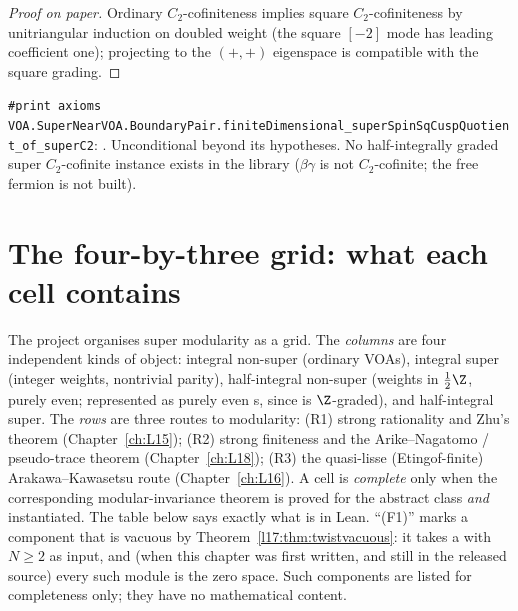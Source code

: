 \begin{proof}[Proof on paper]
Ordinary $C_2$-cofiniteness implies square $C_2$-cofiniteness by unitriangular induction on doubled
weight (the square $[-2]$ mode has leading coefficient one); projecting to the $(+,+)$ eigenspace is
compatible with the square grading.
\end{proof}
\begin{status}
\texttt{\#print axioms
VOA.SuperNearVOA.\allowbreak BoundaryPair.\allowbreak finiteDimensional\_\allowbreak superSpinSqCuspQuotient\_\allowbreak of\_superC2}:
. Unconditional beyond its hypotheses. No half-integrally
graded super $C_2$-cofinite instance exists in the library ($\beta\gamma$ is not $C_2$-cofinite; the free
fermion is not built).
\end{status}

\section{The four-by-three grid: what each cell contains}\label{l17:sec:grid}

The project organises super modularity as a grid. The \emph{columns} are four independent kinds of
object: integral non-super (ordinary VOAs), integral super (integer weights, nontrivial parity),
half-integral non-super (weights in $\frac12\Z$, purely even; represented as purely even
s, since  is $\Z$-graded), and
half-integral super. The \emph{rows} are three routes to modularity: (R1) strong rationality and Zhu's
theorem (Chapter~\ref{ch:L15}); (R2) strong finiteness and the Arike--Nagatomo / pseudo-trace theorem
(Chapter~\ref{ch:L18}); (R3) the quasi-lisse (Etingof-finite) Arakawa--Kawasetsu route
(Chapter~\ref{ch:L16}). A cell is \emph{complete} only when the corresponding modular-invariance
theorem is proved for the abstract class \emph{and} instantiated. The table below says exactly what is
in Lean. ``(F1)'' marks a component that is vacuous by Theorem~\ref{l17:thm:twistvacuous}: it takes
a  with $N\ge2$ as input, and (when this chapter was first written, and still in the released source) every such module is
the zero space. Such components are listed
for completeness only; they have no mathematical content.

